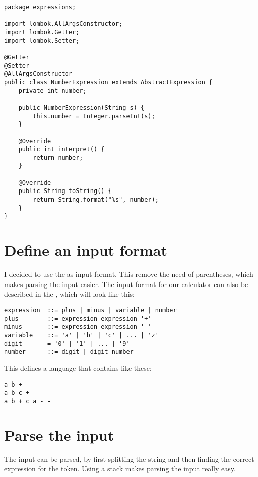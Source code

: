 \begin{verbatim}
package expressions;

import lombok.AllArgsConstructor;
import lombok.Getter;
import lombok.Setter;

@Getter
@Setter
@AllArgsConstructor
public class NumberExpression extends AbstractExpression {
    private int number;

    public NumberExpression(String s) {
        this.number = Integer.parseInt(s);
    }

    @Override
    public int interpret() {
        return number;
    }

    @Override
    public String toString() {
        return String.format("%s", number);
    }
}
\end{verbatim}


\section{Define an input format}

I decided to use the  as input format. This remove the need of parentheses, which makes parsing the input easier. The input format for our calculator can also be described in the , which will look like this: 

\begin{verbatim}
expression  ::= plus | minus | variable | number
plus        ::= expression expression '+'
minus       ::= expression expression '-'
variable    ::= 'a' | 'b' | 'c' | ... | 'z'
digit       = '0' | '1' | ... | '9'
number      ::= digit | digit number
\end{verbatim}

This defines a language that contains  like these: 

\begin{verbatim}
a b +
a b c + -
a b + c a - -
\end{verbatim}

\section{Parse the input}

The input can be parsed, by first splitting the string and then finding the correct expression for the token. Using a stack makes parsing the  input really easy. 

